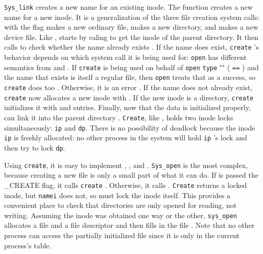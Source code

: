 \lstinline{Sys_link}
creates a new name for an existing inode.
The function
creates a new name for a new inode.
It is a generalization of the three file creation
system calls:
with the
flag makes a new ordinary file,
makes a new directory,
and
makes a new device file.
Like
,
starts by caling
to get the inode of the parent directory.
It then calls
to check whether the name already exists
.
If the name does exist, 
\lstinline{create} 's
behavior depends on which system call it is being used for:
\lstinline{open}
has different semantics from 
and
.
If
\lstinline{create}
is being used on behalf of
\lstinline{open}
\lstinline{type} "" (
\lstinline{==}
)
and the name that exists is itself
a regular file,
then 
\lstinline{open}
treats that as a success,
so
\lstinline{create}
does too
.
Otherwise, it is an error
.
If the name does not already exist,
\lstinline{create}
now allocates a new inode with
.
If the new inode is a directory, 
\lstinline{create}
initializes it with
and
entries.
Finally, now that the data is initialized properly,
can link it into the parent directory
.
\lstinline{Create},
like
,
holds two inode locks simultaneously:
\lstinline{ip}
and
\lstinline{dp}.
There is no possibility of deadlock because
the inode
\lstinline{ip}
is freshly allocated: no other process in the system
will hold 
\lstinline{ip} 's
lock and then try to lock
\lstinline{dp}.

Using
\lstinline{create},
it is easy to implement
,
,
and
.
\lstinline{Sys_open}
is the most complex, because creating a new file is only
a small part of what it can do.
If
is passed the
\_CREATE
flag, it calls
\lstinline{create}
.
Otherwise, it calls
.
\lstinline{Create}
returns a locked inode, but 
\lstinline{namei}
does not, so
must lock the inode itself.
This provides a convenient place to check that directories
are only opened for reading, not writing.
Assuming the inode was obtained one way or the other,
\lstinline{sys_open}
allocates a file and a file descriptor
and then fills in the file
.
Note that no other process can access the partially initialized file since it is only
in the current process's table.


